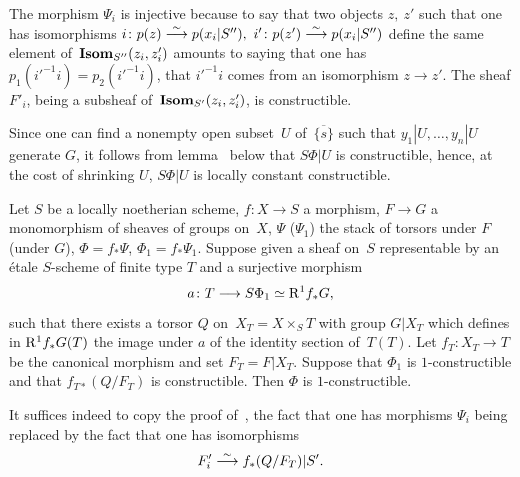 The morphism $\Psi_i$ is injective because to say that two objects $z,~z'$
such that one has isomorphisms $i\colon p(z)\overset{\sim}{\longrightarrow}
p(x_i|S''),~i'\colon p(z')\overset{\sim}{\longrightarrow} p(x_i|S'')$ define the
same element of~$\operatorname{\mathbf{Isom}}_{S''}(z_i,z'_i)$ amounts to
saying that one has $p_1(i'^{-1}i)=p_2(i'^{-1}i)$, \ie that $i'^{-1}i$
comes from an isomorphism $z\to z'$. The sheaf $F'_i$, being a
subsheaf of~$\operatorname{\mathbf{Isom}}_{S'}(z_i,z'_i)$, is constructible.

Since one can find a nonempty open subset~$U$ of~$\overline{\{ s\}}$
such that $y_1|U,\dots,y_n|U$ generate $G$, it follows from
lemma~ below that $S\Phi |U$ is constructible,
hence, at the cost of shrinking $U$, $S\Phi |U$ is locally constant
constructible.

\begin{sublemma}
\label{XIII.3.1.2}
Let $S$ be a locally noetherian scheme, $f\colon X\to S$
a morphism, $F\to G$ a monomorphism of sheaves of groups on~$X$, $\Psi$ (\resp $\Psi_1$) the stack of torsors under $F$
(\resp under $G$), $\Phi=f_*\Psi$, $\Phi_1=f_*\Psi_1$. Suppose
given a sheaf on~$S$ representable by an \'etale $S$-scheme
of finite type $T$ and a surjective morphism
$$
a\colon T\to S\Phi_1\simeq\R^1f_*G,
$$
such that there exists a torsor $Q$ on~$X_T=X\times_ST$ with group
$G|X_T$ which defines in $\mathrm{R}^1f_*G(T)$ the image under $a$ of the
identity section of~$T(T)$. Let $f_T\colon X_T\to T$ be the canonical
morphism and set $F_T=F|X_T$. Suppose that $\Phi_1$ is
$1$-constructible and that $f_{T*}(Q/F_T)$ is constructible. Then
$\Phi$ is $1$-constructible.
\end{sublemma}

It suffices indeed to copy the proof
of~, the fact that one has morphisms $\Psi_i$
being replaced by the fact that one has isomorphisms
$$
F'_i\overset{\sim}{\longrightarrow} f_*(Q/F_T)|S'.
$$

